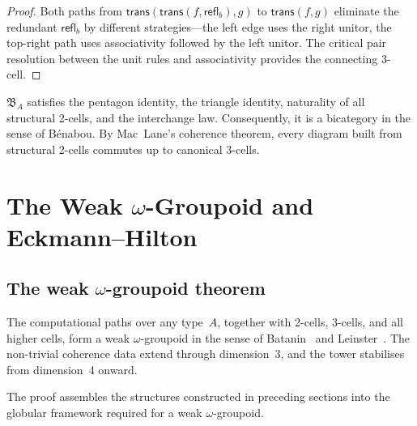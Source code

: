 \documentclass[manuscript]{BSLstyle}
\newcommand{\refl}{\mathsf{refl}}
\newcommand{\trans}{\mathsf{trans}}
\begin{document}
\begin{proof}
Both paths from $\trans(\trans(f, \refl_b), g)$ to $\trans(f, g)$
eliminate the redundant $\refl_b$ by different strategies---the left
edge uses the right unitor, the top-right path uses associativity
followed by the left unitor.  The critical pair resolution between the
unit rules and associativity provides the connecting 3-cell.
\end{proof}

\begin{theorem}\label{thm:bicat-coherence}
$\mathfrak{B}_A$ satisfies the pentagon identity, the triangle identity,
naturality of all structural 2-cells, and the interchange law.
Consequently, it is a bicategory in the sense of B\'enabou.  By
Mac~Lane's coherence theorem, every diagram built from structural 2-cells
commutes up to canonical 3-cells.
\end{theorem}

\section{The Weak $\omega$-Groupoid and Eckmann--Hilton}\label{sec:omega}

\subsection{The weak $\omega$-groupoid theorem}

\begin{theorem}\label{thm:omega-groupoid}
The computational paths over any type~$A$, together with 2-cells,
3-cells, and all higher cells, form a weak $\omega$-groupoid in
the sense of Batanin~\cite{Batanin98} and
Leinster~\cite{Leinster04}.  The non-trivial coherence data extend
through dimension~3, and the tower stabilises from dimension~4
onward.
\end{theorem}

The proof assembles the structures constructed in preceding sections
into the globular framework required for a weak $\omega$-groupoid.
\end{document}
